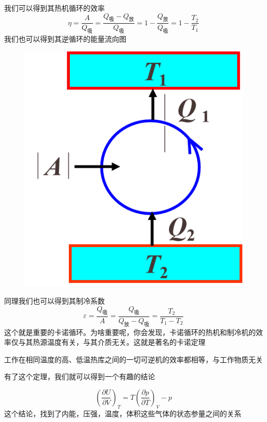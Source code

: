 \documentclass[lang=cn,10pt]{elegantbook}
\begin{document}
	我们可以得到其热机循环的效率
	\begin{equation*}
		\eta=\frac{A}{Q_{\text{吸}}}=\frac{Q_{\text{吸}}-Q_{\text{放}}}{Q_{\text{吸}}}=1-\frac{Q_{\text{放}}}{Q_{\text{吸}}}=1-\frac{T_{2}}{T_{1}}
	\end{equation*}
	我们也可以得到其逆循环的能量流向图
	\begin{figure}[H]
		\centering
		\includegraphics[width=0.3\linewidth]{screenshot012}
		\caption{}
		\label{fig:screenshot012}
	\end{figure}
	同理我们也可以得到其制冷系数
	\begin{equation*}
		\varepsilon =\frac{Q_{\text{吸}}}{A}=\frac{Q_{\text{吸}}}{Q_{\text{放}}-Q_{\text{吸}}}=\frac{T_{2}}{T_{1}-T_{2}}
	\end{equation*}
	这个就是重要的卡诺循环。为啥重要呢，你会发现，卡诺循环的热机和制冷机的效率仅与其热源温度有关，与其介质无关。这就是著名的卡诺定理
	\begin{theorem}[卡诺定理]
		工作在相同温度的高、低温热库之间的一切可逆机的效率都相等，与工作物质无关
	\end{theorem}
	
	有了这个定理，我们就可以得到一个有趣的结论
	\begin{conclusion}
		\begin{equation*}
			\left( \frac{\partial U}{\partial V} \right) _T=T\left( \frac{\partial p}{\partial T} \right) _V-p
		\end{equation*}
		这个结论，找到了内能，压强，温度，体积这些气体的状态参量之间的关系
	\end{conclusion}
\end{document}
